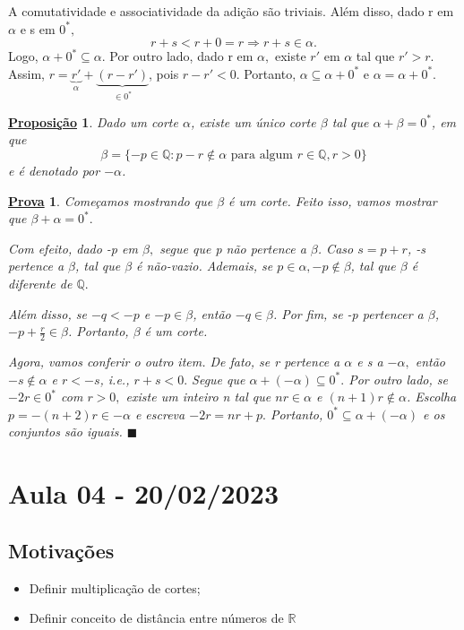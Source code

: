 \documentclass{article}
\newtheorem*{prop*}{\underline{Proposi\c c\~ao}}
\newtheorem*{proof*}{\underline{Prova}}
\renewcommand\qedsymbol{$\blacksquare$}
\begin{document}
  A comutatividade e associatividade da adi\c c\~ao s\~ao triviais. Al\'em disso, dado r em $\alpha$ e s em $0^*,$
  $$
    r + s < r + 0 = r\Rightarrow r + s \in \alpha.
  $$
  Logo, $\alpha + 0^* \subseteq{\alpha}$. Por outro lado, dado r em $\alpha,$ existe $r'\text{ em } \alpha$ tal que $r' > r.$
  Assim, $r = \underbrace{r'}_{\alpha} + \underbrace{(r - r')}_{\in 0^*}$, pois $r - r' < 0.$ Portanto, $\alpha \subseteq{\alpha + 0^*}$ e
 $\alpha = \alpha + 0^*.$
 \begin{prop*}
   Dado um corte $\alpha$, existe um \'unico corte $\beta$ tal que $\alpha + \beta = 0^*$, em que 
   $$
    \beta = \{-p\in \mathbb{Q}: p - r\not\in \alpha \text{ para algum } r\in \mathbb{Q}, r > 0\}
   $$
   e \'e denotado por $-\alpha$. 
 \end{prop*}
\begin{proof*}
  Come\c camos mostrando que $\beta$ \'e um corte. Feito isso, vamos mostrar que $\beta + \alpha = 0^*.$

  Com efeito, dado -p em $\beta,$ segue que p n\~ao pertence a $\beta$. Caso $s = p + r$, -s pertence a $\beta$, tal que 
 $\beta$ \'e n\~ao-vazio. Ademais, se $p\in \alpha, -p\not\in \beta$, tal que $\beta$ \'e diferente de $\mathbb{Q}.$

  Al\'em disso, se $-q < -p$ e $-p\in \beta$, ent\~ao $-q \in \beta$. Por fim, se -p pertencer a $\beta$, $\displaystyle -p + \frac{r}{2}\in \beta$.
Portanto, $\beta$ \'e um corte. 

  Agora, vamos conferir o outro item. De fato, se r pertence a $\alpha$ e s a $-\alpha,$ ent\~ao $-s\not\in \alpha$ e $r < -s$, i.e.,
 $r + s < 0.$ Segue que $\alpha + (-\alpha) \subseteq{0^*}.$ Por outro lado, se $-2r\in 0^*$ com $r > 0,$ existe um inteiro n tal que
  $nr\in \alpha$ e $(n+1)r\not\in \alpha$. Escolha $p = -(n+2)r\in -\alpha$ e escreva $-2r = nr + p.$ Portanto, $0^*\subseteq{\alpha + (-\alpha)}$ e os
  conjuntos s\~ao iguais. \qedsymbol
\end{proof*}

\section{Aula 04 - 20/02/2023}
\subsection{Motiva\c c\~oes}
\begin{itemize}
  \item Definir multiplica\c c\~ao de cortes;
  \item Definir conceito de dist\^ancia entre n\'umeros de $\mathbb{R}$ 
\end{itemize}
\end{document}
